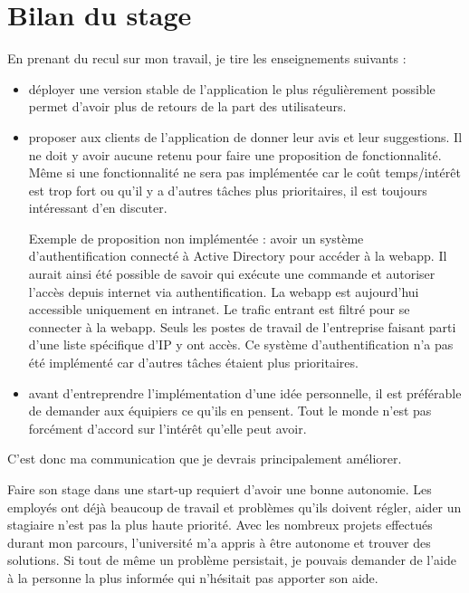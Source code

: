 
\chapter{Bilan du stage}
En prenant du recul sur mon travail, je tire les enseignements suivants :
\begin{itemize}
  \item[\textbullet] déployer une version stable de l'application le plus
    régulièrement possible permet d'avoir plus de retours de la part des
    utilisateurs.

  \item[\textbullet] proposer aux clients de l'application de donner leur avis et leur
    suggestions. Il ne doit y avoir aucune retenu pour faire une proposition
    de fonctionnalité. Même si une fonctionnalité ne sera pas implémentée car le
    coût temps/intérêt est trop fort ou qu'il y a d'autres tâches plus
    prioritaires, il est toujours intéressant d'en discuter.

    Exemple de proposition non implémentée : avoir un système d'authentification
    connecté à Active Directory pour accéder à la webapp. Il aurait ainsi été
    possible de savoir qui exécute une commande et autoriser l'accès depuis
    internet via authentification. La webapp est aujourd'hui accessible
    uniquement en intranet.
    Le trafic entrant est filtré pour se connecter à la webapp. Seuls les postes
    de travail de l'entreprise faisant parti d'une liste spécifique d'IP y ont accès.
    Ce système d'authentification n'a pas été implémenté car d'autres tâches
    étaient plus prioritaires.

  \item[\textbullet] avant d'entreprendre l'implémentation d'une idée personnelle, il est
    préférable de demander aux équipiers ce qu'ils en pensent. Tout le monde
    n'est pas forcément d'accord sur l'intérêt qu'elle peut avoir.
\end{itemize}
C'est donc ma communication que je devrais principalement améliorer.

Faire son stage dans une start-up requiert d'avoir une bonne autonomie.
Les employés ont déjà beaucoup de travail et problèmes qu'ils doivent régler,
aider un stagiaire n'est pas la plus haute priorité. Avec les nombreux projets
effectués durant mon parcours, l'université m'a appris à être autonome et
trouver des solutions. Si tout de même un problème persistait, je pouvais
demander de l'aide à la personne la plus informée qui n'hésitait pas apporter
son aide.

